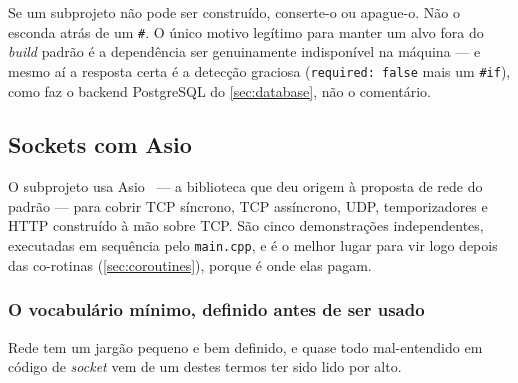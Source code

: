 \begin{regra}
Se um subprojeto não pode ser construído, conserte-o ou apague-o. Não o
esconda atrás de um \texttt{\#}. O único motivo legítimo para manter um alvo
fora do \emph{build} padrão é a dependência ser genuinamente indisponível na
máquina --- e mesmo aí a resposta certa é a detecção graciosa
(\texttt{required: false} mais um \texttt{\#if}), como faz o backend
PostgreSQL do \cref{sec:database}, não o comentário.
\end{regra}

\subsection{Sockets com Asio}
\label{sec:network}

O subprojeto  usa Asio~\cite{asio} --- a biblioteca que deu
origem à proposta de rede do padrão --- para cobrir TCP síncrono, TCP
assíncrono, UDP, temporizadores e HTTP construído à mão sobre TCP. São cinco
demonstrações independentes, executadas em sequência pelo \texttt{main.cpp}, e
é o melhor lugar para vir logo depois das co-rotinas
(\cref{sec:coroutines}), porque é onde elas pagam.

\subsubsection{O vocabulário mínimo, definido antes de ser usado}

Rede tem um jargão pequeno e bem definido, e quase todo mal-entendido em
código de \emph{socket} vem de um destes termos ter sido lido por alto.

